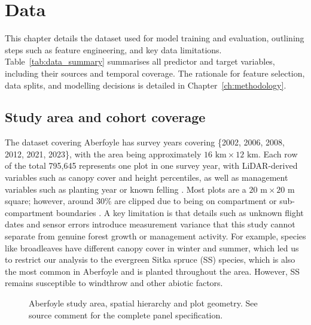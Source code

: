 \chapter{Data}
\label{ch:data}

This chapter details the dataset used for model training and evaluation, outlining steps such as feature engineering, and key data limitations. Table~\ref{tab:data_summary} summarises all predictor and target variables, including their sources and temporal coverage. The rationale for feature selection, data splits, and modelling decisions is detailed in Chapter~\ref{ch:methodology}.


\section{Study area and cohort coverage}
\label{sec:data-source}

The dataset covering Aberfoyle has survey years covering \{2002, 2006, 2008, 2012, 2021, 2023\}, with the area being approximately $16\text{~km} \times 12\text{~km}$. Each row of the total 795,645 represents one plot in one survey year, with LiDAR-derived variables such as canopy cover and height percentiles, as well as management variables such as planting year or known felling . Most plots are a $20\text{~m} \times 20\text{~m}$ square; however, around 30\% are clipped due to being on compartment or sub-compartment boundaries . A key limitation is that details such as unknown flight dates and sensor errors introduce measurement variance that this study cannot separate from genuine forest growth or management activity. For example, species like broadleaves have different canopy cover in winter and summer, which led us to restrict our analysis to the evergreen Sitka spruce (SS) species, which is also the most common in Aberfoyle and is planted throughout the area. However, SS remains susceptible to windthrow and other abiotic factors.

\begin{figure}[!htbp] %
\caption{Aberfoyle study area, spatial hierarchy and plot geometry. See source comment for the
complete panel specification.}
\label{fig:data-study-area}
\end{figure}

